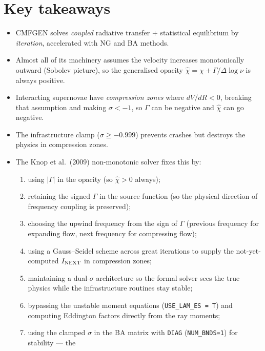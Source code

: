 \documentclass[11pt]{article}
\begin{document}
\section{Key takeaways}

\begin{itemize}[nosep]
  \item CMFGEN solves \emph{coupled} radiative transfer + statistical
        equilibrium by \emph{iteration}, accelerated with NG and BA
        methods.
  \item Almost all of its machinery assumes the velocity increases
        monotonically outward (Sobolev picture), so the generalised
        opacity $\hat\chi = \chi + \Gamma/\Delta\log\nu$ is always
        positive.
  \item Interacting supernovae have \emph{compression zones} where
        $dV/dR < 0$, breaking that assumption and making
        $\sigma < -1$, so $\Gamma$ can be negative and $\hat\chi$ can go
        negative.
  \item The infrastructure clamp ($\sigma \ge -0.999$) prevents crashes
        but destroys the physics in compression zones.
  \item The Knop et al.\ (2009) non-monotonic solver fixes this by:
    \begin{enumerate}[nosep]
      \item using $|\Gamma|$ in the opacity (so $\hat\chi > 0$ always);
      \item retaining the signed $\Gamma$ in the source function (so the
            physical direction of frequency coupling is preserved);
      \item choosing the upwind frequency from the sign of $\Gamma$
            (previous frequency for expanding flow, next frequency for
            compressing flow);
      \item using a Gauss--Seidel scheme across great iterations to
            supply the not-yet-computed $I_{\rm NEXT}$ in compression
            zones;
      \item maintaining a dual-$\sigma$ architecture so the formal
            solver sees the true physics while the infrastructure
            routines stay stable;
      \item bypassing the unstable moment equations
            (\texttt{USE\_LAM\_ES = T}) and computing Eddington factors
            directly from the ray moments;
      \item using the clamped $\sigma$ in the BA matrix with
            \texttt{DIAG} (\texttt{NUM\_BNDS=1}) for stability --- the

\end{enumerate}
\end{itemize}
\end{document}

